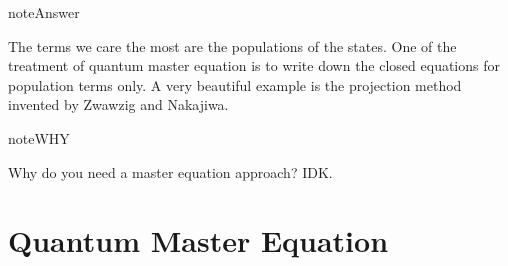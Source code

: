 \documentclass[letterpaper,12pt,english]{sphinxmanual}
\begin{document}
\begin{notice}{note}{Answer}

The terms we care the most are the populations of the states. One of the treatment of quantum master equation is to write down the closed equations for population terms only. A very beautiful example is the projection method invented by Zwawzig and Nakajiwa.
\end{notice}

\begin{notice}{note}{WHY}

Why do you need a master equation approach? IDK.
\end{notice}


\section{Quantum Master Equation}
\label{mastereqn:quantum-master-equation}\label{mastereqn:index-0}
\end{document}
